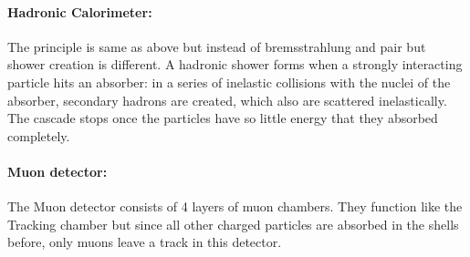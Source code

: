 \paragraph{Hadronic Calorimeter:}
The principle is same as above but instead of bremsstrahlung and pair but shower creation is different. A hadronic shower forms when a strongly interacting particle hits an absorber: in a series of inelastic collisions with the nuclei of the absorber, secondary hadrons are created, which also are scattered inelastically. The cascade stops once the particles have so little energy that they absorbed completely.
\paragraph{Muon detector:}
The Muon detector consists of 4 layers of muon chambers. They function like the Tracking chamber but since all other charged particles are absorbed in the shells before, only muons leave a track in this detector.\cite{muenchen}